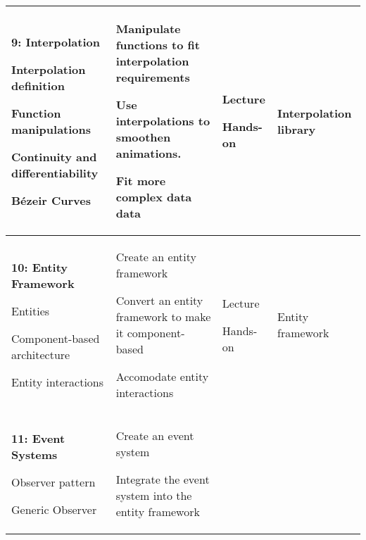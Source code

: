 \documentclass[10pt]{article}
\newenvironment{itemize*}{
\begin{itemize}[leftmargin=1em,noitemsep,nolistsep]
}{\end{itemize}}
\begin{document}
\begin{longtable}{||p{1.8in}|p{2.4in}|p{1.3in}|p{1in}||}
\textbf{9: Interpolation}
	\begin{itemize*}
		\item Interpolation definition
		\item Function manipulations
		\item Continuity and differentiability
		\item B\'ezeir Curves
	\end{itemize*} &
	\begin{itemize*}
		\item Manipulate functions to fit interpolation requirements
		\item Use interpolations to smoothen animations.
		\item Fit more complex data data
	\end{itemize*} & 
	\begin{itemize*}
		\item Lecture
		\item Hands-on
	\end{itemize*} &
	Interpolation library
		\\ \hline
\textbf{10: Entity Framework}
	\begin{itemize*}
		\item Entities
		\item Component-based architecture
		\item Entity interactions
	\end{itemize*} &
	\begin{itemize*}
		\item Create an entity framework
		\item Convert an entity framework to make it component-based
		\item Accomodate entity interactions
	\end{itemize*} &
	\begin{itemize*}
		\item Lecture
		\item Hands-on
	\end{itemize*} & Entity framework \\ \hline
\textbf{11: Event Systems}
	\begin{itemize*}
		\item Observer pattern
		\item Generic Observer
	\end{itemize*} &
	\begin{itemize*}
		\item Create an event system
		\item Integrate the event system into the entity framework

\end{itemize*}
\end{longtable}
\end{document}
